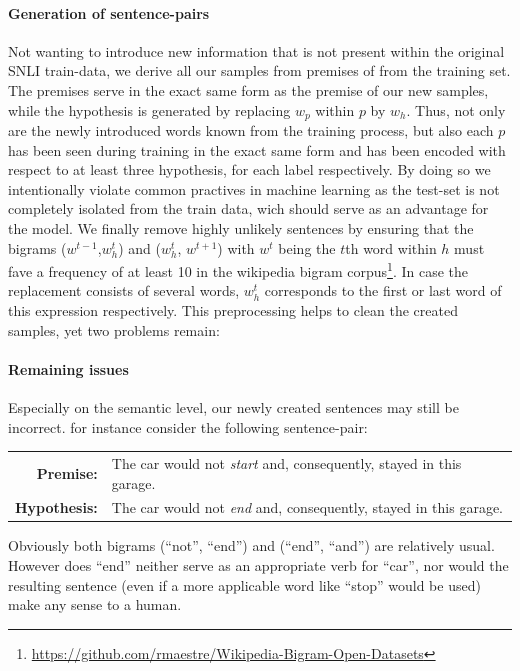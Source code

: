 \paragraph*{Generation of sentence-pairs}
Not wanting to introduce new information that is not present within the original \ac{SNLI} train-data, we derive all our samples from premises of from the training set. The premises  serve in the exact same form as the premise of our new samples, while the hypothesis is generated by replacing $w_p$ within $p$ by $w_h$. Thus, not only are the newly introduced words known from the training process, but also each $p$ has been seen during training in the exact same form and has been encoded with respect to at least three hypothesis, for each label respectively. By doing so we intentionally violate common practives in machine learning as the test-set is not completely isolated from the train data, wich should serve as an advantage for the model. We finally remove highly unlikely sentences by ensuring that the bigrams  ($w^{t-1}$,$w_h^t$) and ($w_h^t$, $w^{t+1}$) with $w^t$ being the $t$th word within $h$ must fave a frequency of at least 10 in the wikipedia bigram corpus\footnote{\href{https://github.com/rmaestre/Wikipedia-Bigram-Open-Datasets}{https://github.com/rmaestre/Wikipedia-Bigram-Open-Datasets}}.  In case the replacement consists of several words, $w^t_h$ corresponds to the first or last word of this expression respectively. This preprocessing helps to clean the created samples, yet two problems remain:

\paragraph*{Remaining issues}

Especially on the semantic level, our newly created sentences may still be incorrect. for instance consider the following sentence-pair:
\begin{center}
\begin{tabular}{rl}
\textbf{Premise:} & The car would not \textit{start} and, consequently, stayed in this garage. \\
\textbf{Hypothesis:} & The car would not \textit{end} and, consequently, stayed in this garage.
\end{tabular}
\end{center}
Obviously both bigrams (``not'', ``end'') and (``end'', ``and'') are relatively usual. However does ``end'' neither serve as an appropriate verb for ``car'', nor would the resulting sentence (even if a more applicable word like ``stop'' would be used) make any sense to a human.
\newline


